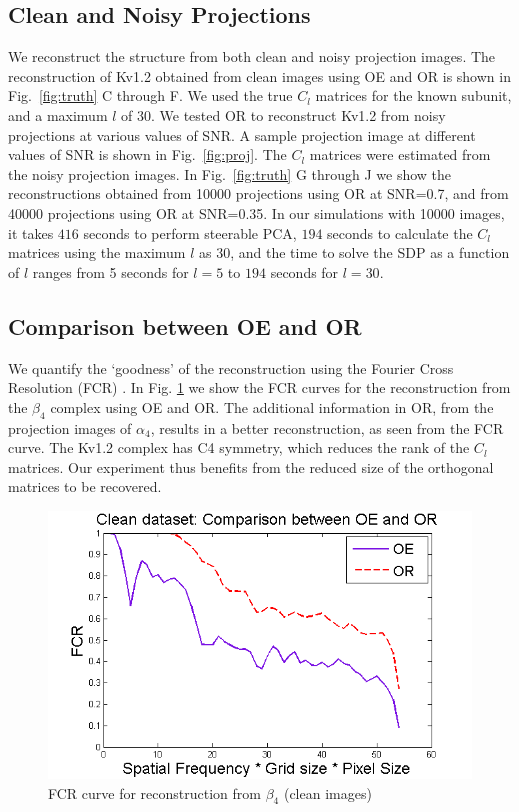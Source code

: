 \subsection{Clean and Noisy Projections}
We reconstruct the structure from both clean and noisy projection images. The
reconstruction of Kv1.2 obtained from clean images using OE and OR is shown in
Fig.~\ref{fig:truth} C through F. We used the true $C_l$ matrices for the known subunit, and a maximum
$l$ of 30. We tested OR to reconstruct Kv1.2 from noisy projections at various values of
SNR. A sample projection image at different values of SNR is shown in Fig.~\ref{fig:proj}.
The $C_l$ matrices were estimated from the noisy projection images. In
Fig.~\ref{fig:truth} G through J we show the reconstructions obtained from 10000 projections using OR
at SNR=0.7, and from 40000 projections using OR at SNR=0.35. In our simulations with 10000 images, it takes $416$ seconds to perform steerable PCA, $194$ seconds to calculate the $C_l$ matrices using the maximum $l$ as 30, and the time to solve the SDP as a function of $l$ ranges from 5 seconds for $l=5$ to $194$ seconds for $l=30$.

\subsection{Comparison between OE and OR}
We quantify the `goodness' of the reconstruction using the Fourier Cross Resolution (FCR)
\cite{fcr}. In Fig. \ref{fig:fsc} we show the FCR curves for the
reconstruction from the $\beta_4$ complex using OE and OR. The additional information in
OR, from the projection images of $\alpha_4$, results in a better reconstruction, as seen
from the FCR curve. The Kv1.2 complex has C4 symmetry, which reduces the rank of the
$C_l$ matrices. Our experiment thus benefits from the reduced size of the orthogonal
matrices to be recovered. 

\begin{figure}[t]
  \centering
  \includegraphics[width=.95\columnwidth]{figures/FSC_final.png}
  \caption{FCR curve for reconstruction from $\beta_4$ (clean images)}\label{fig:fsc}
\end{figure}
 
